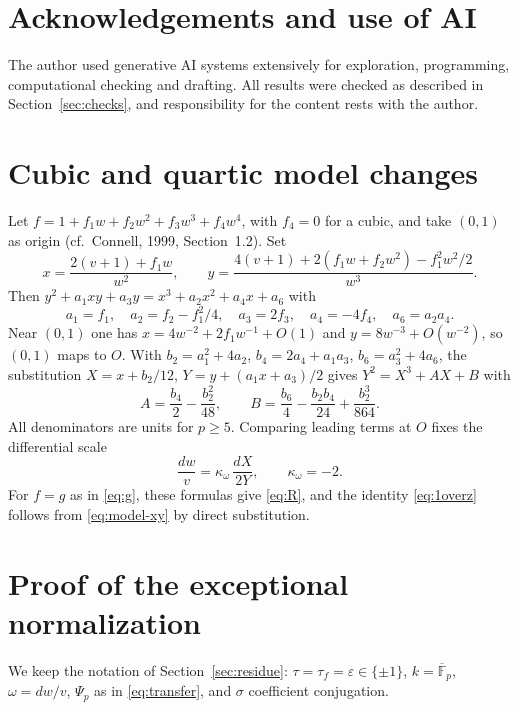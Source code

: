 \documentclass[11pt,a4paper]{article}
\numberwithin{equation}{section}
\theoremstyle{plain}
\theoremstyle{definition}
\newcommand{\F}{\mathbb{F}}
\newcommand{\eps}{\varepsilon}
\begin{document}
\section*{Acknowledgements and use of AI}
The author used generative AI systems extensively for exploration, programming, computational checking and drafting. All results were checked as described in Section~\ref{sec:checks}, and responsibility for the content rests with the author.

\appendix
\section{Cubic and quartic model changes}\label{app:models}
Let $f=1+f_1w+f_2w^2+f_3w^3+f_4w^4$, with $f_4=0$ for a cubic, and take $(0,1)$ as origin (cf.\ Connell, 1999, Section~1.2). Set
\begin{equation}\label{eq:model-xy}
x=\frac{2(v+1)+f_1w}{w^2},\qquad y=\frac{4(v+1)+2(f_1w+f_2w^2)-f_1^2w^2/2}{w^3}.
\end{equation}
Then $y^2+a_1xy+a_3y=x^3+a_2x^2+a_4x+a_6$ with
\begin{equation}\label{eq:model-a}
a_1=f_1,\quad a_2=f_2-f_1^2/4,\quad a_3=2f_3,\quad a_4=-4f_4,\quad a_6=a_2a_4 .
\end{equation}
Near $(0,1)$ one has $x=4w^{-2}+2f_1w^{-1}+O(1)$ and $y=8w^{-3}+O(w^{-2})$, so $(0,1)$ maps to $O$. With $b_2=a_1^2+4a_2$, $b_4=2a_4+a_1a_3$, $b_6=a_3^2+4a_6$, the substitution $X=x+b_2/12$, $Y=y+(a_1x+a_3)/2$ gives $Y^2=X^3+AX+B$ with
\begin{equation}\label{eq:model-AB}
A=\frac{b_4}{2}-\frac{b_2^2}{48},\qquad B=\frac{b_6}{4}-\frac{b_2b_4}{24}+\frac{b_2^3}{864}.
\end{equation}
All denominators are units for $p\ge5$. Comparing leading terms at $O$ fixes the differential scale
\begin{equation}\label{eq:kappa}
\frac{dw}{v}=\kappa_\omega\,\frac{dX}{2Y},\qquad \kappa_\omega=-2 .
\end{equation}
For $f=g$ as in \eqref{eq:g}, these formulas give \eqref{eq:R}, and the identity \eqref{eq:1overz} follows from \eqref{eq:model-xy} by direct substitution.

\section{Proof of the exceptional normalization}\label{app:exception}
We keep the notation of Section~\ref{sec:residue}: $\tau=\tau_f=\eps\in\{\pm1\}$, $k=\overline{\F}_p$, $\omega=dw/v$, $\Psi_p$ as in \eqref{eq:transfer}, and $\sigma$ coefficient conjugation.
\end{document}
